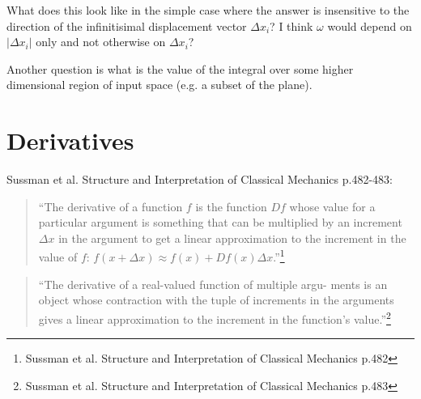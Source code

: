 What does this look like in the simple case where the answer is insensitive to the direction of the
infinitisimal displacement vector $\Delta x_i$? I think $\omega$ would depend on $|\Delta x_i|$ only
and not otherwise on $\Delta x_i$?

Another question is what is the value of the integral over some higher dimensional region of input
space (e.g. a subset of the plane).


\section{Derivatives}

Sussman et al. Structure and Interpretation of Classical Mechanics p.482-483:

\begin{quote}
  ``The derivative of a function $f$ is the function $D f$ whose value for a particular
  argument is something that can be multiplied by an increment $\Delta x$ in the argument to get a
  linear approximation to the increment in the value of $f$:
  $f(x + \Delta x) \approx f(x) + D f(x) \Delta x$.''\footnote{Sussman et al. Structure and Interpretation of
    Classical Mechanics p.482}
\end{quote}

\begin{quote}
  ``The derivative of a real-valued function of multiple argu- ments is an object whose contraction
  with the tuple of increments in the arguments gives a linear approximation to the increment in the
  function’s value.''\footnote{Sussman et al. Structure and Interpretation of Classical Mechanics
    p.483}
\end{quote}


